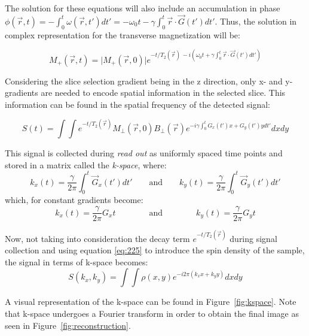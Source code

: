 The solution for these equations will also include an accumulation in phase $\phi(\vec{r}, t) = - \int_0^t \omega(\vec{r}, t') dt' = -\omega_0 t - \gamma \int_0^t \vec{r} \cdot \vec{G}(t') dt'$. Thus, the solution in complex representation for the transverse magnetization will be:

\begin{equation}
    M_{+}(\vec{r},t) = \lvert M_{+}(\vec{r},0) \rvert e^{-t/T_2(\vec{r}) \, -i (\omega_0 t + \gamma \int_0^t \vec{r} \cdot \vec{G}(t') dt')}
\end{equation}

Considering the slice selection gradient being in the z direction, only x- and y-gradients are needed to encode spatial information in the selected slice. This information can be found in the spatial frequency of the detected signal:

\begin{equation}
    S(t) = \int \int 
            e^{-t/T_2(\vec{r})} M_{\perp}(\vec{r},0) 
                B_{\perp}(\vec{r}) 
                e^{ -i \gamma \int_0^t G_x(t')x + G_y(t')y dt'} dx dy
\end{equation}

This signal is collected during \textit{read out} as uniformly spaced time points \cite{Haacke1999} and stored in a matrix called the \textit{k-space}, where:
\begin{equation}
    k_x(t) = \frac{\gamma}{2 \pi} \int_0^t \vec{G}_x(t') dt' 
    \qquad\text{and}\qquad
    k_y(t) = \frac{\gamma}{2 \pi} \int_0^t \vec{G}_y(t') dt' 
\end{equation}
which, for constant gradients become:
\begin{equation}
    k_x(t) = \frac{\gamma}{2 \pi} G_x t
    \qquad\qquad\text{and}\qquad\qquad
    k_y(t) = \frac{\gamma}{2 \pi} G_y t
\end{equation}

Now, not taking into consideration the decay term $e^{-t/T_2(\vec{r})}$ during signal collection and using equation \ref{eq:225} to introduce the spin density of the sample, the signal in terms of k-space becomes:
\begin{equation}
    S(k_x, k_y) = \int \int \rho(x,y) e^{-i 2 \pi (k_x x + k_y y)} dx dy
\end{equation}

A visual representation of the k-space can be found in Figure~\ref{fig:kspace}. Note that k-space undergoes a Fourier transform in order to obtain the final image as seen in Figure~\ref{fig:reconstruction}.

